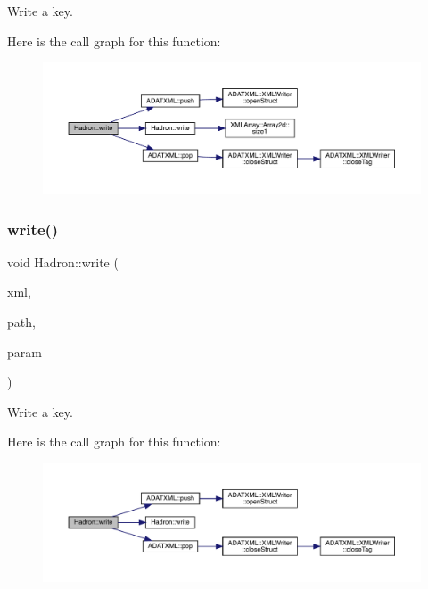 Write a key. 

Here is the call graph for this function\+:\nopagebreak
\begin{figure}[H]
\begin{center}
\leavevmode
\includegraphics[width=350pt]{d1/daf/namespaceHadron_ad432e121844a2fa83775051e43481116_cgraph}
\end{center}
\end{figure}
\mbox{\label{namespaceHadron_a4b91e53beed52be0c8431a4464285dfd}} 
\subsubsection{\texorpdfstring{write()}{write()}\hspace{0.1cm}{\footnotesize\ttfamily [23/95]}}
{\footnotesize\ttfamily void Hadron\+::write (\begin{DoxyParamCaption}\item[{\mbox{\hyperlink{classADATXML_1_1XMLWriter}{X\+M\+L\+Writer}} \&}]{xml,  }\item[{const std\+::string \&}]{path,  }\item[{const \mbox{\hyperlink{structHadron_1_1KeyTetraQuarkElementalOperator__t}{Key\+Tetra\+Quark\+Elemental\+Operator\+\_\+t}} \&}]{param }\end{DoxyParamCaption})}



Write a key. 

Here is the call graph for this function\+:\nopagebreak
\begin{figure}[H]
\begin{center}
\leavevmode
\includegraphics[width=350pt]{d1/daf/namespaceHadron_a4b91e53beed52be0c8431a4464285dfd_cgraph}
\end{center}
\end{figure}
\mbox{\label{namespaceHadron_ac358b1203bd94f6b26452402911ce174}} 
